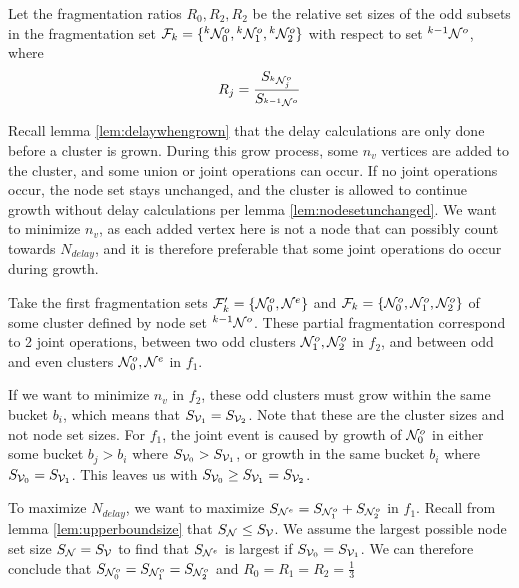\begin{lemma}\label{lem:fragratio}
  Let the fragmentation ratios $R_0, R_2, R_2$ be the relative set sizes of the odd subsets in the fragmentation set $\mathcal{F}_{k} = \{{}^{k}\mathcal{N}^o_0, {}^{k}\mathcal{N}^{o}_1, {}^{k}\mathcal{N}^{o}_2 \}$ with respect to set ${}^{k-1}\mathcal{N}^o$, where
  \begin{equation}\label{eq:fragratio}
    R_j = \frac{S_{{}^{k}\mathcal{N}^o_j}}{S_{{}^{k-1}\mathcal{N}^o}}
  \end{equation}
\end{lemma}

Recall lemma \ref{lem:delaywhengrown} that the delay calculations are only done before a cluster is grown. During this grow process, some $n_v$ vertices are added to the cluster, and some union or joint operations can occur. If no joint operations occur, the node set stays unchanged, and the cluster is allowed to continue growth without delay calculations per lemma \ref{lem:nodesetunchanged}. We want to minimize $n_v$, as each added vertex here is not a node that can possibly count towards $N_{delay}$, and it is therefore preferable that some joint operations do occur during growth.

Take the first fragmentation sets $\mathcal{F}'_{k} = \{\mathcal{N}^o_0, \mathcal{N}^{e} \}$ and $\mathcal{F}_{k} = \{\mathcal{N}^o_0, \mathcal{N}^{o}_1, \mathcal{N}^{o}_2 \}$ of some cluster defined by node set ${}^{k-1}\mathcal{N}^o$. These partial fragmentation correspond to 2 joint operations, between two odd clusters $ \mathcal{N}^{o}_1, \mathcal{N}^{o}_2 $ in $f_2$, and between odd and even clusters $\mathcal{N}^o_0, \mathcal{N}^{e} $ in $f_1$.

If we want to minimize $n_v$ in $f_2$, these odd clusters must grow within the same bucket $b_i$, which means that $S_{\mathcal{V}_1} = S_{\mathcal{V}_2}$. Note that these are the cluster sizes and not node set sizes. For $f_1$, the joint event is caused by growth of $\mathcal{N}^o_0$ in either some bucket $b_j > b_i$ where $ S_{\mathcal{V}_0} > S_{\mathcal{V}_1} $, or growth in the same bucket $b_i$ where $S_{\mathcal{V}_0} = S_{\mathcal{V}_1} $. This leaves us with $S_{\mathcal{V}_0} \geq S_{\mathcal{V}_1} = S_{\mathcal{V}_2}$.

To maximize $N_{delay}$, we want to maximize $S_{\mathcal{N}^e} = S_{\mathcal{N}^o_1} + S_{\mathcal{N}^o_2}$ in $f_1$. Recall from lemma \ref{lem:upperboundsize} that $S_{\mathcal{N}} \leq S_{\mathcal{V}}$. We assume the largest possible node set size $S_{\mathcal{N}} = S_{\mathcal{V}}$ to find that $ S_{\mathcal{N}^e} $ is largest if $S_{\mathcal{V}_0} = S_{\mathcal{V}_1}$. We can therefore conclude that $S_{\mathcal{N}^o_0} = S_{\mathcal{N}^o_1} = S_{\mathcal{N}^o_2}$ and $R_0 = R_1 = R_2 = \frac{1}{3}$

